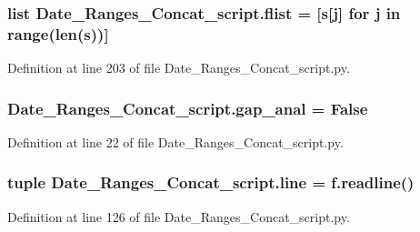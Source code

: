 \subsubsection[{flist}]{\setlength{\rightskip}{0pt plus 5cm}list Date\+\_\+\+Ranges\+\_\+\+Concat\+\_\+script.\+flist = \mbox{[}{\bf s}\mbox{[}j\mbox{]} for j in range(len({\bf s}))\mbox{]}}\label{namespace_date___ranges___concat__script_a85f8f04b5018cab654cd0912d726418c}


Definition at line 203 of file Date\+\_\+\+Ranges\+\_\+\+Concat\+\_\+script.\+py.

\hypertarget{namespace_date___ranges___concat__script_a2be9f688e04252334e2560929ca454e1}{}
\subsubsection[{gap\+\_\+anal}]{\setlength{\rightskip}{0pt plus 5cm}Date\+\_\+\+Ranges\+\_\+\+Concat\+\_\+script.\+gap\+\_\+anal = False}\label{namespace_date___ranges___concat__script_a2be9f688e04252334e2560929ca454e1}


Definition at line 22 of file Date\+\_\+\+Ranges\+\_\+\+Concat\+\_\+script.\+py.

\hypertarget{namespace_date___ranges___concat__script_a006bd1ae40aa6caa8031d62e130d3811}{}
\subsubsection[{line}]{\setlength{\rightskip}{0pt plus 5cm}tuple Date\+\_\+\+Ranges\+\_\+\+Concat\+\_\+script.\+line = f.\+readline()}\label{namespace_date___ranges___concat__script_a006bd1ae40aa6caa8031d62e130d3811}


Definition at line 126 of file Date\+\_\+\+Ranges\+\_\+\+Concat\+\_\+script.\+py.

\hypertarget{namespace_date___ranges___concat__script_af9826d87d967e0af51a56f35bb53dbad}{}
